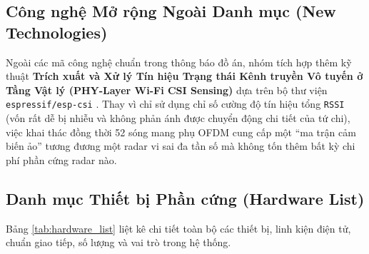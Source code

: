 \documentclass{hcmut-report}
\begin{document}
\subsection[Công nghệ Mở rộng Ngoài Danh mục]{Công nghệ Mở rộng Ngoài Danh mục (New Technologies)}
Ngoài các mã công nghệ chuẩn trong thông báo đồ án, nhóm tích hợp thêm kỹ thuật \textbf{Trích xuất và Xử lý Tín hiệu Trạng thái Kênh truyền Vô tuyến ở Tầng Vật lý (PHY-Layer Wi-Fi CSI Sensing)} dựa trên bộ thư viện \texttt{espressif/esp-csi} \cite{espressif_csi}. Thay vì chỉ sử dụng chỉ số cường độ tín hiệu tổng \texttt{RSSI} (vốn rất dễ bị nhiễu và không phản ánh được chuyển động chi tiết của tứ chi), việc khai thác đồng thời 52 sóng mang phụ OFDM cung cấp một ``ma trận cảm biến ảo'' tương đương một radar vi sai đa tần số mà không tốn thêm bất kỳ chi phí phần cứng radar nào.

\subsection[Danh mục Thiết bị Phần cứng]{Danh mục Thiết bị Phần cứng (Hardware List)}
Bảng \ref{tab:hardware_list} liệt kê chi tiết toàn bộ các thiết bị, linh kiện điện tử, chuẩn giao tiếp, số lượng và vai trò trong hệ thống.
\end{document}

